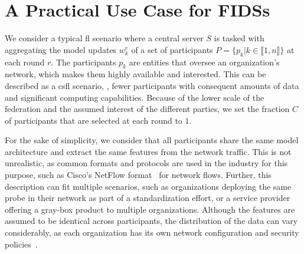 \section{A Practical Use Case for FIDSs\label{sec:app.overview}}

We consider a typical \gls{fl} scenario where a central server $S$ is tasked with aggregating the model updates $w_k^r$ of a set of participants $P = \lbrace p_k | k\in \llbracket 1,n \rrbracket\rbrace$ at each round $r$.
The participants $p_k$ are entities that oversee an organization's network, which makes them highly available and interested.
This can be described as a \gls{csfl} scenario, \ie, fewer participants with consequent amounts of data and significant computing capabilities.
Because of the lower scale of the federation and the assumed interest of the different parties, we set the fraction $C$ of participants that are selected at each round to $1$.

For the sake of simplicity, we consider that all participants share the same model architecture and extract the same features from the network traffic.
This is not unrealistic, as common formats and protocols are used in the industry for this purpose, such as Cisco's NetFlow format~\cite{rfc3954} for network flows.
Further, this description can fit multiple scenarios, such as organizations deploying the same probe in their network as part of a standardization effort, or a service provider offering a gray-box product to multiple organizations.
Although the features are assumed to be identical across participants, the distribution of the data can vary considerably, as each organization has its own network configuration and security policies~\cite{zhou_surveycoordinatedattacks_2010}.

